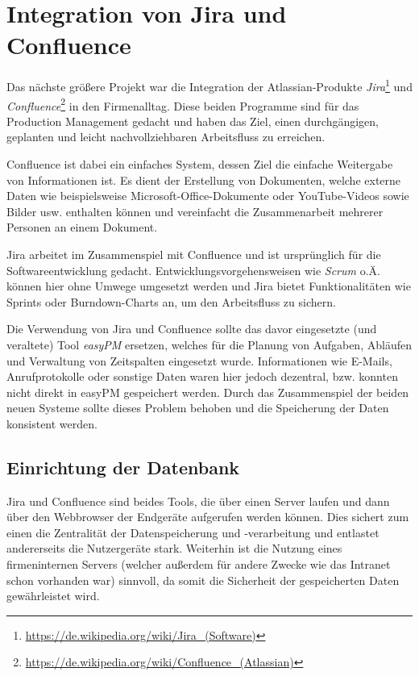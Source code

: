 \chapter{Integration von Jira und Confluence}
\label{ch:jira}

Das nächste größere Projekt war die Integration der Atlassian-Produkte \textit{Jira}\footnote{\url{https://de.wikipedia.org/wiki/Jira_(Software)}}
und \textit{Confluence}\footnote{\url{https://de.wikipedia.org/wiki/Confluence_(Atlassian)}} in den Firmenalltag. Diese beiden Programme sind für das
Production Management gedacht und haben das Ziel, einen durchgängigen, geplanten
und leicht nachvollziehbaren Arbeitsfluss zu erreichen.

Confluence ist dabei ein einfaches System, dessen Ziel die einfache Weitergabe von
Informationen ist. Es dient der Erstellung von Dokumenten, welche externe Daten
wie beispielsweise Microsoft-Office-Dokumente oder YouTube-Videos sowie Bilder usw.
enthalten können und vereinfacht die Zusammenarbeit mehrerer Personen an einem Dokument.

Jira arbeitet im Zusammenspiel mit Confluence und ist ursprünglich für die Softwareentwicklung
gedacht. Entwicklungsvorgehensweisen wie \textit{Scrum} o.Ä. können hier ohne Umwege
umgesetzt werden und Jira bietet Funktionalitäten wie Sprints oder Burndown-Charts
an, um den Arbeitsfluss zu sichern.

Die Verwendung von Jira und Confluence sollte das davor eingesetzte (und veraltete)
Tool \textit{easyPM} ersetzen, welches für die Planung von Aufgaben, Abläufen und
Verwaltung von Zeitspalten eingesetzt wurde. Informationen wie E-Mails, Anrufprotokolle
oder sonstige Daten waren hier jedoch dezentral, bzw. konnten nicht direkt in easyPM
gespeichert werden. Durch das Zusammenspiel der beiden neuen Systeme sollte dieses
Problem behoben und die Speicherung der Daten konsistent werden.



\section{Einrichtung der Datenbank}
\label{sec:jira-einrichtung-datenbank}

Jira und Confluence sind beides Tools, die über einen Server laufen und dann über
den Webbrowser der Endgeräte aufgerufen werden können. Dies sichert zum einen die
Zentralität der Datenspeicherung und -verarbeitung und entlastet andererseits die
Nutzergeräte stark. Weiterhin ist die Nutzung eines firmeninternen Servers (welcher
außerdem für andere Zwecke wie das Intranet schon vorhanden war) sinnvoll, da somit
die Sicherheit der gespeicherten Daten gewährleistet wird.

